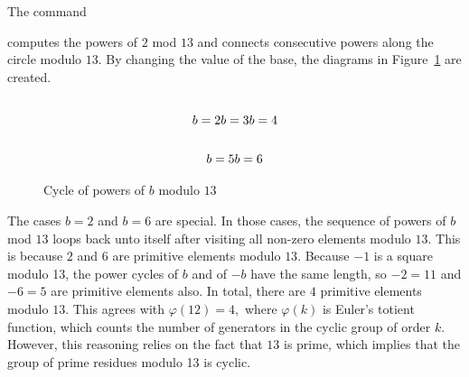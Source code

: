 The command 
{\tt

}
computes the powers of $2$ mod $13$ and connects consecutive powers along the circle modulo $13.$
By changing the value of the base, the diagrams in Figure~\ref{ref:power:13} are created.
\begin{figure}
$$
{\arraycolsep=0pt
\begin{array}{ccc}
\begin{array}{c}
\\
b=2\\
\end{array}
&
\begin{array}{c}
\\
b=3\\
\end{array}
&
\begin{array}{c}
\\
b=4\\
\end{array}\\
\end{array}}
$$
$$
{\arraycolsep=0pt
\begin{array}{cc}
\begin{array}{c}
\\
b=5\\
\end{array}
&
\begin{array}{c}
\\
b=6\\
\end{array}
\\
\end{array}
}
$$
\caption{\label{ref:power:13}Cycle of powers of $b$ modulo $13$}
\end{figure}
The cases $b=2$ and $b=6$ are special. In those cases, the sequence of powers of $b$ mod $13$ 
loops back unto itself after visiting all non-zero elements modulo $13.$ 
This is because $2$ and $6$ are primitive elements modulo $13.$ 
Because $-1$ is a square modulo 13, 
the power cycles of $b$ and of $-b$ have the same length, 
so $-2 = 11$ and $-6 = 5$ are primitive elements also. 
In total, there are $4$ primitive elements modulo $13$. 
This agrees with $\varphi(12) = 4,$ where $\varphi(k)$ is Euler's totient function, 
which counts the number of generators in the cyclic group of order $k$. 
However, this reasoning relies on the fact that $13$ is prime, 
which implies that the group of prime residues modulo 13 is cyclic. 

